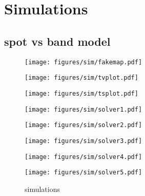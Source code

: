 \documentclass[twocolumn]{aastex631}
\begin{document}
\section{Simulations}

\subsection{spot vs band model}


\begin{figure*}[ht!]
    \centering
    \caption{simulations}
    \begin{minipage}[b]{0.2\textwidth}
        \centering
        \texttt{[image: figures/sim/fakemap.pdf]}
        \label{fig:sim-fakemap}
    \end{minipage}
    \hfill
    \begin{minipage}[b]{0.2\textwidth}
        \centering
        \texttt{[image: figures/sim/tvplot.pdf]}
        \label{fig:sim-tvplot}
    \end{minipage}
    \hfill
    \begin{minipage}[b]{0.2\textwidth}
        \centering
        \texttt{[image: figures/sim/tsplot.pdf]}
        \label{fig:sim-tvplot}
    \end{minipage}
    \hfill\hfill\hfill\hfill\hfill\hfill\hfill
    \begin{minipage}[b]{0.2\textwidth}
    \end{minipage}
    
    \vfill
    
    \begin{minipage}[b]{0.18\textwidth}
        \centering
        \texttt{[image: figures/sim/solver1.pdf]}
        \label{fig:sim-solver1}
    \end{minipage}
    \hfill
    \begin{minipage}[b]{0.18\textwidth}
        \centering
        \texttt{[image: figures/sim/solver2.pdf]}
        \label{fig:sim-solver2}
    \end{minipage}
    \hfill
    \begin{minipage}[b]{0.18\textwidth}
        \centering
        \texttt{[image: figures/sim/solver3.pdf]}
        \label{fig:sim-solver3}
    \end{minipage}
    \hfill
    \begin{minipage}[b]{0.18\textwidth}
        \centering
        \texttt{[image: figures/sim/solver4.pdf]}
        \label{fig:sim-solver4}
    \end{minipage}
    \hfill
    \begin{minipage}[b]{0.18\textwidth}
        \centering
        \texttt{[image: figures/sim/solver5.pdf]}
        \label{fig:sim-solver5}
    \end{minipage}
\end{figure*} 




\end{document}
